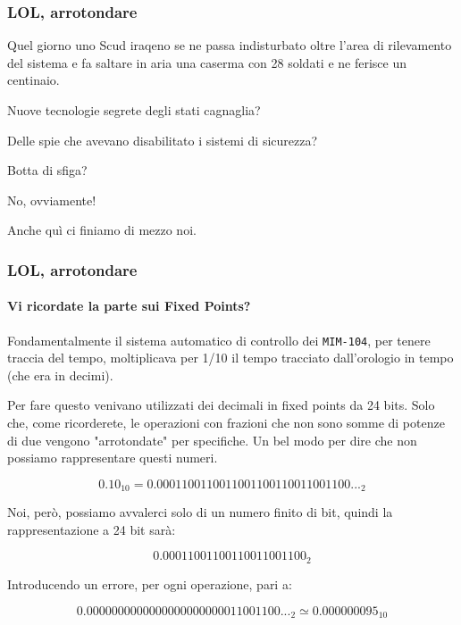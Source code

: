 \documentclass{beamer}
\begin{document}
	  \begin{frame}
	  		\frametitle{LOL, arrotondare}
	  	    
	    Quel giorno uno Scud iraqeno se ne passa indisturbato oltre l'area di rilevamento del sistema
	    e fa saltare in aria una caserma con 28 soldati e ne ferisce un centinaio.
	    
	    \vspace{2em}
	    \pause
	    
	    Nuove tecnologie segrete degli stati cagnaglia?
	    
	    \pause
	    
	    Delle spie che avevano disabilitato i sistemi di sicurezza?
	    
	    \pause
	    
	    Botta di sfiga?
	    
	    \pause
	    
	    \vspace{2em}
	    
	    No, ovviamente!
	    
	    Anche quì ci finiamo di mezzo noi.
	    
	  \end{frame}
	  
	  \begin{frame}
	  		\frametitle{LOL, arrotondare}
	    \framesubtitle{Vi ricordate la parte sui Fixed Points?}
	  	    
	    Fondamentalmente il sistema automatico di controllo dei \texttt{MIM-104}, per tenere traccia
	    del tempo, moltiplicava per 1/10 il tempo tracciato dall'orologio in tempo (che era in decimi).
	    
	    Per fare questo venivano utilizzati dei decimali in fixed points da 24 bits. Solo che, come ricorderete,
	    le operazioni con frazioni che non sono somme di potenze di due vengono "arrotondate" per specifiche. Un
	    bel modo per dire che non possiamo rappresentare questi numeri.
	    
	    $$0.10_{10} = 0.0001100110011001100110011001100\text{...}_{2}$$
	    
	    Noi, però, possiamo avvalerci solo di un numero finito di bit, quindi la rappresentazione a 24 bit sarà:
	    
	    $$0.00011001100110011001100_{2}$$
	    
	    Introducendo un errore, per ogni operazione, pari a:
	    
	    $$0.0000000000000000000000011001100\text{...}_{2} \simeq 0.000000095_{10}$$
	  \end{frame}
	  
\end{document}
